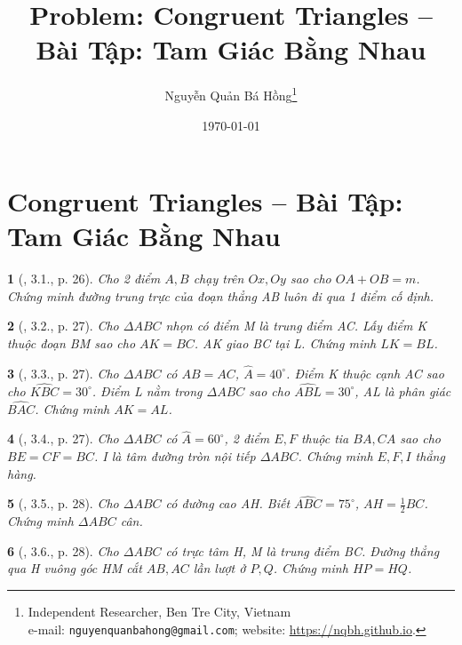 \documentclass{article}
\title{Problem: Congruent Triangles -- Bài Tập: Tam Giác Bằng Nhau}
\author{Nguyễn Quản Bá Hồng\footnote{Independent Researcher, Ben Tre City, Vietnam\\e-mail: \texttt{nguyenquanbahong@gmail.com}; website: \url{https://nqbh.github.io}.}}
\date{\today}
\newtheorem{baitoan}{}
\begin{document}
\maketitle
\tableofcontents


\section{Congruent Triangles -- Bài Tập: Tam Giác Bằng Nhau}

\begin{baitoan}[\cite{Hung_Mai_Toan_7_hinh_hoc}, 3.1., p. 26]
	Cho 2 điểm $A,B$ chạy trên $Ox,Oy$ sao cho $OA + OB = m$. Chứng minh đường trung trực của đoạn thẳng AB luôn đi qua 1 điểm cố định.
\end{baitoan}

\begin{baitoan}[\cite{Hung_Mai_Toan_7_hinh_hoc}, 3.2., p. 27]
	Cho $\Delta ABC$ nhọn có điểm M là trung điểm AC. Lấy điểm K thuộc đoạn BM sao cho $AK = BC$. AK giao BC tại L. Chứng minh $LK = BL$.
\end{baitoan}

\begin{baitoan}[\cite{Hung_Mai_Toan_7_hinh_hoc}, 3.3., p. 27]
	Cho $\Delta ABC$ có $AB = AC$, $\widehat{A} = 40^\circ$. Điểm K thuộc cạnh AC sao cho $\widehat{KBC} = 30^\circ$. Điểm L nằm trong $\Delta ABC$ sao cho $\widehat{ABL} = 30^\circ$, AL là phân giác $\widehat{BAC}$. Chứng minh $AK = AL$.
\end{baitoan}

\begin{baitoan}[\cite{Hung_Mai_Toan_7_hinh_hoc}, 3.4., p. 27]
	Cho $\Delta ABC$ có $\widehat{A} = 60^\circ$, 2 điểm $E,F$ thuộc tia $BA,CA$ sao cho $BE = CF = BC$. I là tâm đường tròn nội tiếp $\Delta ABC$. Chứng minh $E,F,I$ thẳng hàng.
\end{baitoan}

\begin{baitoan}[\cite{Hung_Mai_Toan_7_hinh_hoc}, 3.5., p. 28]
	Cho $\Delta ABC$ có đường cao AH. Biết $\widehat{ABC} = 75^\circ$, $AH = \frac{1}{2}BC$. Chứng minh $\Delta ABC$ cân.
\end{baitoan}

\begin{baitoan}[\cite{Hung_Mai_Toan_7_hinh_hoc}, 3.6., p. 28]
	Cho $\Delta ABC$ có trực tâm H, M là trung điểm BC. Đường thẳng qua H vuông góc HM cắt $AB,AC$ lần lượt ở $P,Q$. Chứng minh $HP = HQ$.
\end{baitoan}
\end{document}
